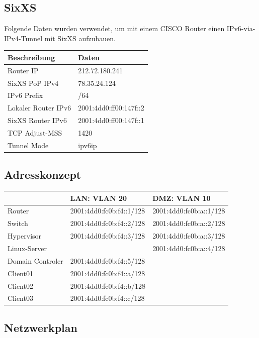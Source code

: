 \subsection{SixXS}

Folgende Daten wurden verwendet, um mit einem CISCO Router einen IPv6-via-IPv4-Tunnel mit SixXS aufzubauen.\newline	

\noindent \begin{tabular}{|l|l|}
\hline
Beschreibung				& Daten						\\
\hline
Router IP				& 212.72.180.241		 		\\
SixXS PoP IPv4			& 78.35.24.124			 	\\
IPv6 Prefix				& /64					 	\\	
Lokaler Router IPv6		& 2001:4dd0:ff00:147f::2 	\\
SixXS Router IPv6 		& 2001:4dd0:ff00:147f::1		\\
TCP Adjust-MSS			& 1420						\\
Tunnel Mode				& ipv6ip						\\
\hline
\end{tabular}

\subsection{Adresskonzept}

\begin{tabular}{|l|l|l|}
\hline
						& LAN: VLAN 20					& DMZ: VLAN 10 \\
\hline
Router					& 2001:4dd0:fc0b:f4::1/128		& 2001:4dd0:fc0b:a::1/128 \\
Switch					& 2001:4dd0:fc0b:f4::2/128		& 2001:4dd0:fc0b:a::2/128 \\
Hypervisor				& 2001:4dd0:fc0b:f4::3/128		& 2001:4dd0:fc0b:a::3/128 \\	
Linux-Server			&								& 2001:4dd0:fc0b:a::4/128 \\
Domain Controler 		& 2001:4dd0:fc0b:f4::5/128		& \\
Client01				& 2001:4dd0:fc0b:f4::a/128		& \\
Client02				& 2001:4dd0:fc0b:f4::b/128		& \\
Client03				& 2001:4dd0:fc0b:f4::c/128		& \\
\hline
\end{tabular}

\subsection{Netzwerkplan}

